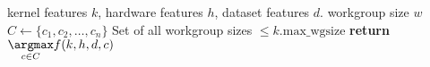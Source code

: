 \begin{algorithmic}[1]
  \Require kernel features $k$, hardware features $h$, dataset features
  $d$.
  \Ensure workgroup size $w$
  \State $C \leftarrow \{c_1, c_2, \ldots, c_n \}$
  \Comment Set of all workgroup sizes $\le k.\text{max\_wgsize}$
  \State \textbf{return} $\underset{c \in C}{\argmax} f(k,h,d,c)$
\end{algorithmic}
